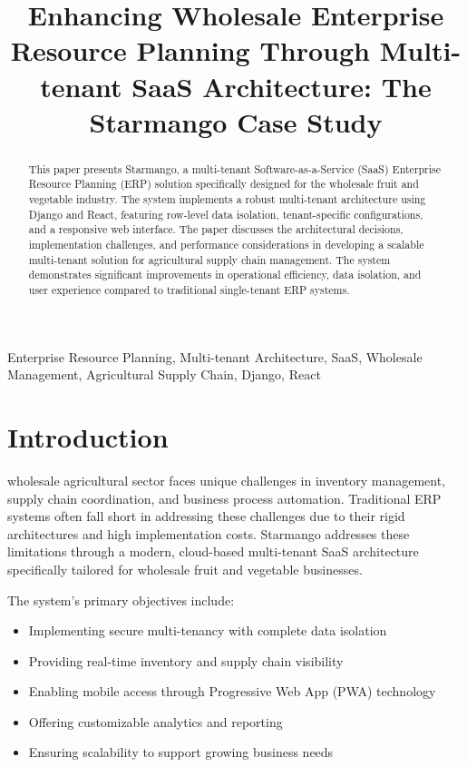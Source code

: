 \documentclass[conference]{IEEEtran}
\title{Enhancing Wholesale Enterprise Resource Planning Through Multi-tenant SaaS Architecture: The Starmango Case Study}
\author{
    \IEEEauthorblockN{Your Name}
    \IEEEauthorblockA{Your Institution \\
    Your Department \\
    Email: your.email@institution.edu}
}
\begin{document}
\maketitle

\begin{abstract}
This paper presents Starmango, a multi-tenant Software-as-a-Service (SaaS) Enterprise Resource Planning (ERP) solution specifically designed for the wholesale fruit and vegetable industry. The system implements a robust multi-tenant architecture using Django and React, featuring row-level data isolation, tenant-specific configurations, and a responsive web interface. The paper discusses the architectural decisions, implementation challenges, and performance considerations in developing a scalable multi-tenant solution for agricultural supply chain management. The system demonstrates significant improvements in operational efficiency, data isolation, and user experience compared to traditional single-tenant ERP systems.
\end{abstract}

\begin{IEEEkeywords}
Enterprise Resource Planning, Multi-tenant Architecture, SaaS, Wholesale Management, Agricultural Supply Chain, Django, React
\end{IEEEkeywords}

\section{Introduction}
 wholesale agricultural sector faces unique challenges in inventory management, supply chain coordination, and business process automation. Traditional ERP systems often fall short in addressing these challenges due to their rigid architectures and high implementation costs. Starmango addresses these limitations through a modern, cloud-based multi-tenant SaaS architecture specifically tailored for wholesale fruit and vegetable businesses.

The system's primary objectives include:
\begin{itemize}
    \item Implementing secure multi-tenancy with complete data isolation
    \item Providing real-time inventory and supply chain visibility
    \item Enabling mobile access through Progressive Web App (PWA) technology
    \item Offering customizable analytics and reporting
    \item Ensuring scalability to support growing business needs
\end{itemize}
\end{document}
